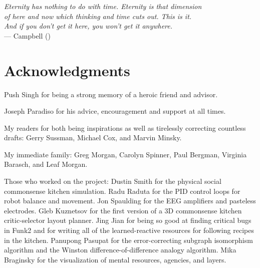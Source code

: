 




\begin{flushright}{\slshape    
Eternity has nothing to do with time. Eternity is that dimension \\
of here and now which thinking and time cuts out. This is it. \\
And if you don't get it here, you won't get it anywhere.} \\ \medskip
    --- Campbell (\citeyear{campbell:1988})
\end{flushright}



\bigskip

\begingroup
\let\clearpage\relax
\let\cleardoublepage\relax
\let\cleardoublepage\relax
\chapter*{Acknowledgments}

Push Singh for being a strong memory of a heroic friend and advisor.

\vspace{5mm}

\noindent Joseph Paradiso for his advice, encouragement and support at all times.

\vspace{5mm}

\noindent My readers for both being inspirations as well as tirelessly correcting countless drafts:
Gerry Sussman,
Michael Cox, and
Marvin Minsky.

\vspace{5mm}

\noindent My immediate family:
Greg Morgan, Carolyn Spinner, Paul Bergman, Virginia Barasch, and Leaf Morgan.

\vspace{5mm}

\noindent Those who worked on the project:
Dustin Smith for the physical social commonsense kitchen simulation.
Radu Raduta for the PID control loops for robot balance and movement.
Jon Spaulding for the EEG amplifiers and pasteless electrodes.
Gleb Kuznetsov for the first version of a 3D commonsense kitchen critic-selector layout planner.
Jing Jian for being so good at finding critical bugs in Funk2 and for writing all of the learned-reactive resources for following recipes in the kitchen.
Panupong Pasupat for the error-correcting subgraph isomorphism algorithm and the Winston difference-of-difference analogy algorithm.
Mika Braginsky for the visualization of mental resources, agencies, and layers.

